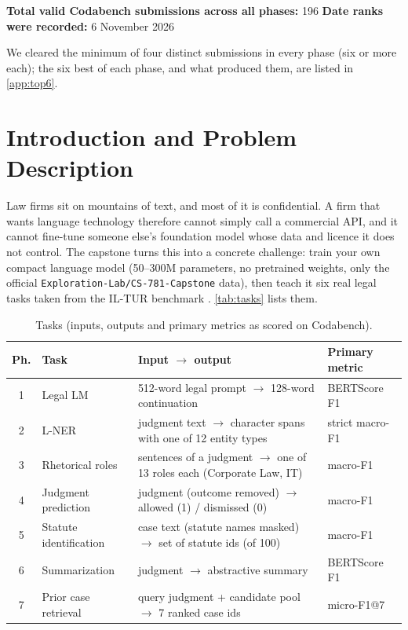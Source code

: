 \documentclass[11pt, oneside]{article}
\begin{document}
\noindent
\textbf{Total valid Codabench submissions across all phases:} 196
\quad
\textbf{Date ranks were recorded:} 6 November 2026

\medskip
\noindent We cleared the minimum of four distinct submissions in every phase (six or more each); the six best
of each phase, and what produced them, are listed in \autoref{app:top6}.

\section{Introduction and Problem Description}
Law firms sit on mountains of text, and most of it is confidential.  A firm that wants language technology
therefore cannot simply call a commercial API, and it cannot fine-tune someone else's foundation model whose
data and licence it does not control.  The capstone turns this into a concrete challenge: train your own
compact language model (50--300M parameters, no pretrained weights, only the official
\texttt{Exploration-Lab/CS-781-Capstone} data), then teach it six real legal tasks taken from the IL-TUR
benchmark \cite{joshi2024iltur}.  \autoref{tab:tasks} lists them.

\begin{table}[!t]\centering\footnotesize
\caption{Tasks (inputs, outputs and primary metrics as scored on Codabench).}\label{tab:tasks}
\scriptsize\begin{tabularx}{\linewidth}{clXl}\toprule
Ph. & Task & Input $\rightarrow$ output & Primary metric\\\midrule
1 & Legal LM & 512-word legal prompt $\rightarrow$ 128-word continuation & BERTScore F1\\
2 & L-NER & judgment text $\rightarrow$ character spans with one of 12 entity types & strict macro-F1\\
3 & Rhetorical roles & sentences of a judgment $\rightarrow$ one of 13 roles each (Corporate Law, IT) & macro-F1\\
4 & Judgment prediction & judgment (outcome removed) $\rightarrow$ allowed (1) / dismissed (0) & macro-F1\\
5 & Statute identification & case text (statute names masked) $\rightarrow$ set of statute ids (of 100) & macro-F1\\
6 & Summarization & judgment $\rightarrow$ abstractive summary & BERTScore F1\\
7 & Prior case retrieval & query judgment + candidate pool $\rightarrow$ 7 ranked case ids & micro-F1@7\\
\bottomrule\end{tabularx}\end{table}
\end{document}

